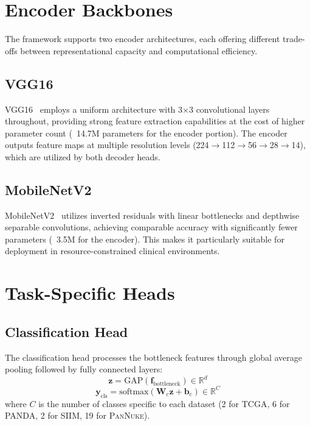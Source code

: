 \documentclass[11pt,a4paper,twoside]{report}
\newcommand{\dataset}[1]{\textsc{#1}}
\begin{document}
\section{Encoder Backbones}

The framework supports two encoder architectures, each offering different trade-offs between representational capacity and computational efficiency.

\subsection{VGG16}

VGG16~\cite{simonyan2014vgg} employs a uniform architecture with 3$\times$3 convolutional layers throughout, providing strong feature extraction capabilities at the cost of higher parameter count (~14.7M parameters for the encoder portion). The encoder outputs feature maps at multiple resolution levels (224$\to$112$\to$56$\to$28$\to$14), which are utilized by both decoder heads.

\subsection{MobileNetV2}

MobileNetV2~\cite{sandler2018mobilenetv2} utilizes inverted residuals with linear bottlenecks and depthwise separable convolutions, achieving comparable accuracy with significantly fewer parameters (~3.5M for the encoder). This makes it particularly suitable for deployment in resource-constrained clinical environments.

\section{Task-Specific Heads}

\subsection{Classification Head}

The classification head processes the bottleneck features through global average pooling followed by fully connected layers:
\begin{equation}
\mathbf{z} = \text{GAP}(\mathbf{f}_{\text{bottleneck}}) \in \mathbb{R}^{d}
\end{equation}
\begin{equation}
\mathbf{y}_{\text{cls}} = \text{softmax}(\mathbf{W}_c \mathbf{z} + \mathbf{b}_c) \in \mathbb{R}^{C}
\end{equation}
where $C$ is the number of classes specific to each dataset (2 for \dataset{TCGA}, 6 for \dataset{PANDA}, 2 for \dataset{SIIM}, 19 for \dataset{PanNuke}).
\end{document}
